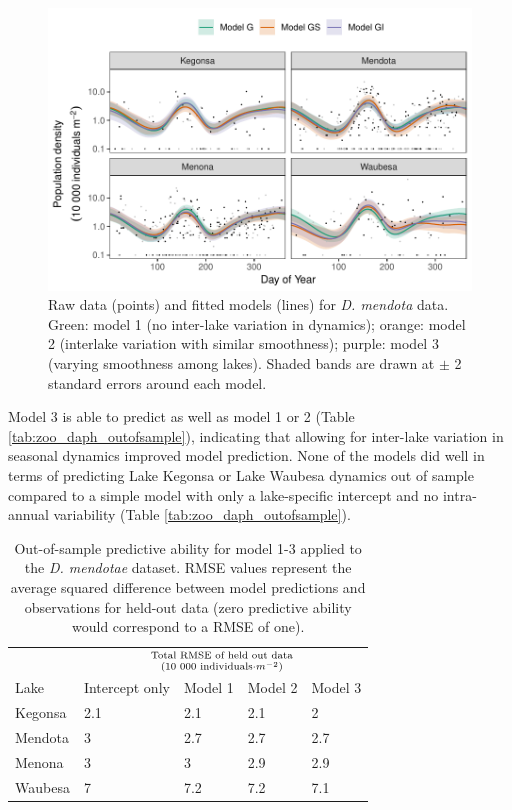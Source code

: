 \documentclass[12pt]{article}
\begin{document}
\begin{figure}
\centering
\includegraphics{../figures/zoo_daph_plot-1.pdf}
\caption{\label{fig:daph_smooth}Raw data (points) and fitted models
(lines) for \textit{D. mendota} data. Green: model 1 (no inter-lake
variation in dynamics); orange: model 2 (interlake variation with
similar smoothness); purple: model 3 (varying smoothness among lakes).
Shaded bands are drawn at \(\pm\) 2 standard errors around each model.}
\end{figure}

Model 3 is able to predict as well as model 1 or 2 (Table
\ref{tab:zoo_daph_outofsample}), indicating that allowing for inter-lake
variation in seasonal dynamics improved model prediction. None of the
models did well in terms of predicting Lake Kegonsa or Lake Waubesa
dynamics out of sample compared to a simple model with only a
lake-specific intercept and no intra-annual variability (Table
\ref{tab:zoo_daph_outofsample}).

\begin{table}

\caption{\label{tab:zoo_daph_outofsample_kable}Out-of-sample predictive ability for model 1-3 applied to the \textit{D. mendotae} dataset. RMSE values represent the average squared difference between model predictions and observations for held-out data (zero predictive ability would correspond to a RMSE of one).}
\centering
\begin{tabular}[t]{lllll}
\toprule
\multicolumn{1}{c}{ } & \multicolumn{4}{c}{\Large{${\text{Total RMSE of held out data}}\atop{(\text{10 000 individuals}\cdot m^{-2})}$}} \\
\cmidrule(l{2pt}r{2pt}){2-5}
Lake & Intercept only & Model 1 & Model 2 & Model 3\\
\midrule
Kegonsa & 2.1 & 2.1 & 2.1 & 2\\
Mendota & 3 & 2.7 & 2.7 & 2.7\\
Menona & 3 & 3 & 2.9 & 2.9\\
Waubesa & 7 & 7.2 & 7.2 & 7.1\\
\bottomrule
\end{tabular}
\end{table}
\end{document}
